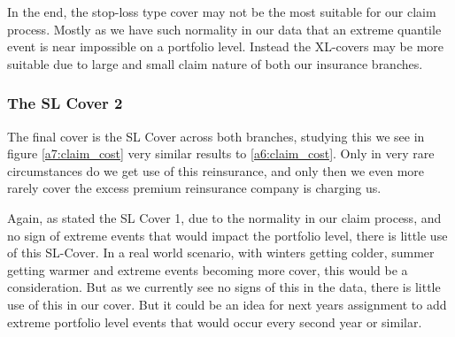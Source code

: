 \documentclass[11pt]{article}
\begin{document}
In the end, the stop-loss type cover may not be the most suitable for our claim process.
Mostly as we have such normality in our data that an extreme quantile event is near impossible on a portfolio level.
Instead the XL-covers may be more suitable due to large and small claim nature of both our insurance branches.


\subsubsection*{The SL Cover 2}
The final cover is the SL Cover across both branches, studying this we see in figure \ref{a7:claim_cost} very similar results to \ref{a6:claim_cost}.
Only in very rare circumstances do we get use of this reinsurance, and only then we even more rarely cover the excess premium reinsurance company is charging us.

Again, as stated the SL Cover 1, due to the normality in our claim process, and no sign of extreme events that would impact the portfolio level, there is little use of this SL-Cover.
In a real world scenario, with winters getting colder,   summer getting warmer and extreme events becoming more cover, this would be a consideration.
But as we currently see no signs of this in the data, there is little use of this in our cover.
But it could be an idea for next years assignment to add extreme portfolio level events that would occur every second year or similar.
\end{document}
